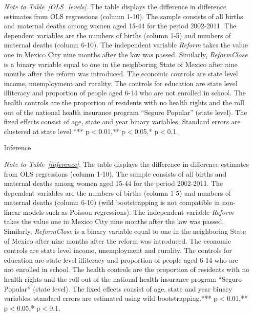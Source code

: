 \documentclass[a4paper, 11pt]{article}
\begin{document}
\begin{spacing}{1.4}
\begin{table}
\begin{threeparttable}
		
		\begin{tablenotes} 
			\footnotesize
			\item \textit{Note to Table~\ref{OLS_levels}}. The table displays the difference in difference estimates from OLS regressions (column 1-10). The sample consists of all births and maternal deaths among women aged 15-44 for the period 2002-2011. The dependent variables are the numbers of births (column 1-5) and numbers of maternal deaths (column 6-10). The independent variable \textit{Reform} takes the value one in Mexico City nine months after the law was passed. Similarly, \textit{ReformClose} is a binary variable equal to one in the neighboring State of Mexico after nine months after the reform was introduced. The economic controls are state level income, unemployment and rurality. The controls for education are state level illiteracy and proportion of people aged 6-14 who are not enrolled in school. The health controls are the proportion of residents with no health rights and the roll out of the national health insurance program ``Seguro Popular'' (state level). The fixed effects consist of age, state and year binary variables. Standard errors are clustered at state level.*** p$<$0.01,** p$<$0.05,* p$<$0.1.
				
		\end{tablenotes} 
	\end{threeparttable}
\end{table} 



\restoregeometry


\begin{table}\caption{Inference} \label{inference}
  \begin{threeparttable}
    {\footnotesize 	}
    \begin{tablenotes}
      \footnotesize
    \item \textit{Note to Table~\ref{inference}}. The table displays the difference in difference estimates from OLS regressions (column 1-10). The sample consists of all births and maternal deaths among women aged 15-44 for the period 2002-2011. The dependent variables are the numbers of births (column 1-5) and numbers of maternal deaths (column 6-10) (wild bootstrapping is not compatible in non-linear models such as Poisson regressions). The independent variable \textit{Reform} takes the value one in Mexico City nine months after the law was passed. Similarly, \textit{ReformClose} is a binary variable equal to one in the neighboring State of Mexico after nine months after the reform was introduced. The economic controls are state level income, unemployment and rurality. The controls for education are state level illiteracy and proportion of people aged 6-14 who are not enrolled in school. The health controls are the proportion of residents with no health rights and the roll out of the national health insurance program ``Seguro Popular'' (state level). The fixed effects consist of age, state and year binary variables. standard errors are estimated using wild bootstrapping.*** p$<$0.01,** p$<$0.05,* p$<$0.1.
    

\end{tablenotes}
\end{threeparttable}
\end{table}
\end{spacing}
\end{document}
